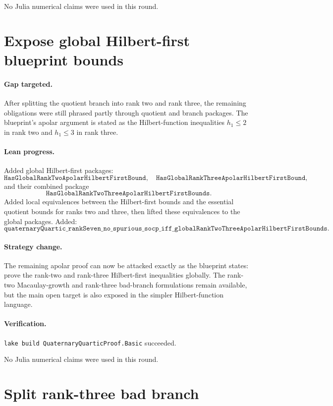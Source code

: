 \documentclass[11pt]{article}
\begin{document}
No Julia numerical claims were used in this round.

\section*{Expose global Hilbert-first blueprint bounds}

\paragraph{Gap targeted.}
After splitting the quotient branch into rank two and rank three, the remaining
obligations were still phrased partly through quotient and branch packages.
The blueprint's apolar argument is stated as the Hilbert-function inequalities
\(h_1\le2\) in rank two and \(h_1\le3\) in rank three.

\paragraph{Lean progress.}
Added global Hilbert-first packages:
\[
\texttt{HasGlobalRankTwoApolarHilbertFirstBound},
\quad
\texttt{HasGlobalRankThreeApolarHilbertFirstBound},
\]
and their combined package
\[
\texttt{HasGlobalRankTwoThreeApolarHilbertFirstBounds}.
\]
Added local equivalences between the Hilbert-first bounds and the essential
quotient bounds for ranks two and three, then lifted these equivalences to the
global packages.  Added:
\[
\texttt{quaternaryQuartic\_rankSeven\_no\_spurious\_socp\_iff\_globalRankTwoThreeApolarHilbertFirstBounds}.
\]

\paragraph{Strategy change.}
The remaining apolar proof can now be attacked exactly as the blueprint states:
prove the rank-two and rank-three Hilbert-first inequalities globally.  The
rank-two Macaulay-growth and rank-three bad-branch formulations remain
available, but the main open target is also exposed in the simpler
Hilbert-function language.

\paragraph{Verification.}
\texttt{lake build QuaternaryQuarticProof.Basic} succeeded.

No Julia numerical claims were used in this round.

\section*{Split rank-three bad branch}
\end{document}

